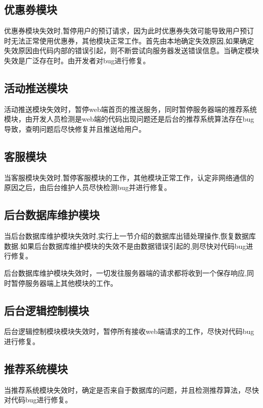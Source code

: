 \subsection{优惠券模块}

优惠券模块失效时,暂停用户的预订请求，因为此时优惠券失效可能导致用户预订时无法正常使用优惠券，其他模块正常工作。首先由本地确定失效原因,如果确定失效原因由代码内部的错误引起，则不断尝试向服务器发送错误信息。当确定模块失效是广泛存在时。由开发者对bug进行修复。

\subsection{活动推送模块}
活动推送模块失效时，暂停web端首页的推送服务，同时暂停服务器端的推荐系统模块，由开发人员检测是web端的代码出现问题还是后台的推荐系统算法存在bug导致，查明问题后尽快修复并且推送给用户。


\subsection{客服模块}

当客服模块失效时,暂停客服模块的工作，其他模块正常工作，认定非网络通信的原因之后，由后台维护人员尽快检测bug并进行修复。


\subsection{后台数据库维护模块}

当后台数据库维护模块失效时,实行上一节介绍的数据库出错处理操作,恢复数据库数据.如果后台数据库维护模块的失效不是由数据错误引起的,则尽快对代码bug进行修复。

后台数据库维护模块失效时，一切发往服务器端的请求都将收到一个保存响应,同时暂停服务器端上其他模块的工作。

\subsection{后台逻辑控制模块}

后台逻辑控制模块模块失效时，暂停所有接收web端请求的工作，尽快对代码bug进行修复。

\subsection{推荐系统模块}

当推荐系统模块失效时，确定是否来自于数据库的问题，并且检测推荐算法，尽快对代码bug进行修复。